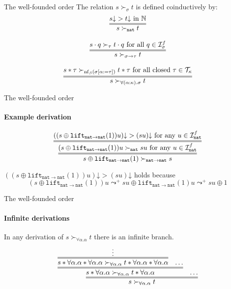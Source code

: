 \documentclass[10pt,presentation,color=names]{beamer}
\newcommand{\Iterms}{\mathcal{I}}
\newcommand{\arrtype}{\rightarrow}
\newcommand{\app}[2]{#1 \cdot #2}
\newcommand{\tapp}[2]{#1 * #2}
\newcommand{\subst}[2]{#1:=#2}
\newcommand{\nat}{\mathtt{nat}}
\newcommand{\lift}{\mathtt{lift}}
\newcommand{\Tc}{\mathcal{T}}
\newcommand{\nf}{\mathrm{nf}}
\newcommand{\da}{\mathord{\downarrow}}
\begin{document}
\begin{frame}{The well-founded order}
  The relation $s \succ_{\sigma} t$ is defined coinductively by:
  \[
  \begin{array}{c}
    \infer={s \succ_\nat t}{s\da > t\da \text{ in }\mathbb{N}} \\ \\
    \infer={s \succ_{\sigma\arrtype\tau} t}{\app{s}{q} \succ_{\tau} \app{t}{q} \text{ for all } q \in \Iterms^f_\sigma} \\ \\
    \infer={s \succ_{\forall(\alpha:\kappa).\sigma} t}{\tapp{s}{\tau} \succ_{\nf_\beta(\sigma[\subst{\alpha}{\tau}])} \tapp{t}{\tau} \text{ for all closed } \tau \in \Tc_{\kappa}}
  \end{array}
  \]


\end{frame}

\begin{frame}{The well-founded order}
  \framesubtitle{Example derivation}
  \[
  \infer={s \oplus \lift_{\nat\to\nat}(1) \succ_{\nat\to\nat} s}{
    \infer={(s \oplus \lift_{\nat\to\nat}(1)) u \succ_\nat s u \text{ for any } u \in \Iterms^f_\nat}{
      ((s \oplus \lift_{\nat\to\nat}(1)) u)\da > (su)\da \text{ for any } u \in \Iterms^f_\nat
    }
  }
  \]

  \bigskip
  \pause

  $((s \oplus \lift_{\nat\to\nat}(1)) u)\da > (su)\da$ holds because
  \[
  (s \oplus \lift_{\nat\to\nat}(1)) u \leadsto^+ su \oplus \lift_{\nat\to\nat}(1) u \leadsto^+ su \oplus 1
  \]
\end{frame}

\begin{frame}{The well-founded order}
  \framesubtitle{Infinite derivations}
  In any derivation of $s \succ_{\forall\alpha . \alpha} t$ there is an infinite branch.
  \[
  \infer={s \succ_{\forall \alpha . \alpha} t}{
    \infer={\tapp{s}{\forall\alpha.\alpha} \succ_{\forall \alpha . \alpha} \tapp{t}{\forall\alpha.\alpha}}{
      \infer={\tapp{\tapp{s}{\forall\alpha.\alpha}}{
          \forall \alpha . \alpha} \succ_{\forall \alpha . \alpha}\tapp{\tapp{t}{\forall\alpha.\alpha}}{\forall\alpha.\alpha}}{\vdots} &
      \ldots} &
    \ldots
  }
  \]
\end{frame}
\end{document}
